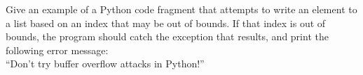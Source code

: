  \label{sssec:ex1_23}

Give an example of a Python code fragment that attempts to write an element to a list based on an index that may be out of bounds. If that index is out of bounds, the program should catch the exception that results, and print the following error message:\\
``Don't try buffer overflow attacks in Python!''

